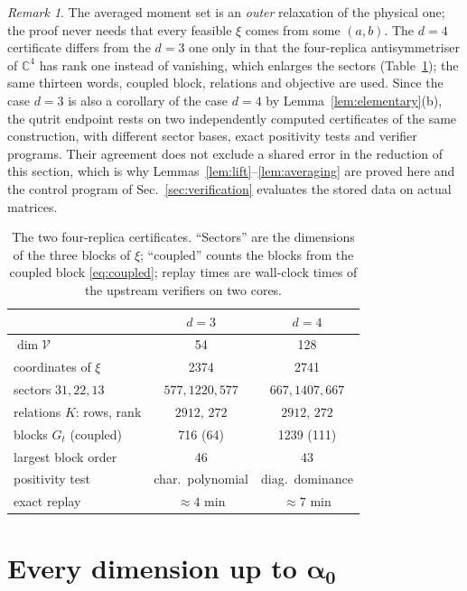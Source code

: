 \documentclass[aps,pra,twocolumn,superscriptaddress,nofootinbib,longbibliography]{revtex4-2}
\newcommand{\C}{\mathbb C}
\newcommand{\V}{\mathcal V}
\theoremstyle{plain}
\theoremstyle{definition}
\theoremstyle{remark}
\newtheorem{remark}[theorem]{Remark}
\begin{document}
\begin{remark}\label{rem:cert}
The averaged moment set is an \emph{outer} relaxation of the physical one; the proof never needs that every feasible $\xi$ comes from some $(a,b)$. The $d=4$ certificate differs from the $d=3$ one only in that the four-replica antisymmetriser of $\C^4$ has rank one instead of vanishing, which enlarges the sectors (Table~\ref{tab:cert}); the same thirteen words, coupled block, relations and objective are used. Since the case $d=3$ is also a corollary of the case $d=4$ by Lemma~\ref{lem:elementary}(b), the qutrit endpoint rests on two independently computed certificates of the same construction, with different sector bases, exact positivity tests and verifier programs. Their agreement does not exclude a shared error in the reduction of this section, which is why Lemmas~\ref{lem:lift}--\ref{lem:averaging} are proved here and the control program of Sec.~\ref{sec:verification} evaluates the stored data on actual matrices.
\end{remark}

\begin{table}[t]\centering\footnotesize\setlength{\tabcolsep}{5pt}
\begin{tabular}{@{}lcc@{}}
\toprule
 & $d=3$ \cite{Zenodo} & $d=4$ \cite{Liu}\\
\midrule
$\dim\V$ & 54 & 128\\
coordinates of $\xi$ & 2374 & 2741\\
\quad sectors $31,22,13$ & $577,1220,577$ & $667,1407,667$\\
relations $K$: rows, rank & $2912$, $272$ & $2912$, $272$\\
blocks $G_t$ (coupled) & 716 (64) & 1239 (111)\\
largest block order & 46 & 43\\
positivity test & char.\ polynomial & diag.\ dominance\\
exact replay & $\approx4$ min & $\approx7$ min\\
\bottomrule
\end{tabular}
\caption{The two four-replica certificates. ``Sectors'' are the dimensions of the three blocks of $\xi$; ``coupled'' counts the blocks from the coupled block \eqref{eq:coupled}; replay times are wall-clock times of the upstream verifiers on two cores.}\label{tab:cert}
\end{table}

\section{Every dimension up to \texorpdfstring{$\boldsymbol{\alpha_0}$}{alpha0}}\label{sec:uniform}
\end{document}

